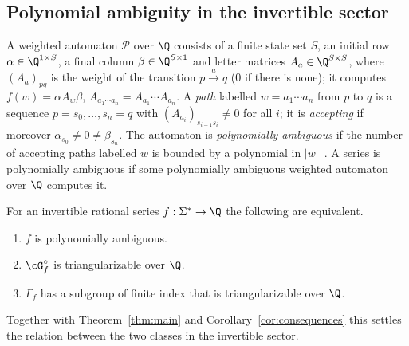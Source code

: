 \subsection{Polynomial ambiguity in the invertible sector}\label{ssec:polyamb}
A weighted automaton $\mathcal P$ over $\Q$ consists of a finite state set $S$, an initial row
$\alpha\in\Q^{1\times S}$, a final column $\beta\in\Q^{S\times 1}$ and letter matrices
$A_a\in\Q^{S\times S}$, where $(A_a)_{pq}$ is the weight of the transition $p\xrightarrow{a}q$
($0$ if there is none); it computes $f(w)=\alpha A_w\beta$, $A_{a_1\cdots a_n}=A_{a_1}\cdots A_{a_n}$.
A \emph{path} labelled $w=a_1\cdots a_n$ from $p$ to $q$ is a sequence $p=s_0,\ldots,s_n=q$ with
$(A_{a_i})_{s_{i-1}s_i}\ne0$ for all $i$; it is \emph{accepting} if moreover $\alpha_{s_0}\ne0\ne\beta_{s_n}$.
The automaton is \emph{polynomially ambiguous} if the number of accepting paths labelled $w$ is
bounded by a polynomial in $|w|$~\cite{MPS26,PS24}. A series is polynomially ambiguous if some
polynomially ambiguous weighted automaton over $\Q$ computes it.

\begin{theorem}\label{thm:polyamb}
For an invertible rational series $f:\Sigma^*\to\Q$ the following are equivalent.
\begin{enumerate}
\item $f$ is polynomially ambiguous.
\item $\cG_f^\circ$ is triangularizable over $\Q$.
\item $\Gamma_f$ has a subgroup of finite index that is triangularizable over $\Q$.
\end{enumerate}
\end{theorem}

Together with Theorem~\ref{thm:main} and Corollary~\ref{cor:consequences} this settles the
relation between the two classes in the invertible sector.

